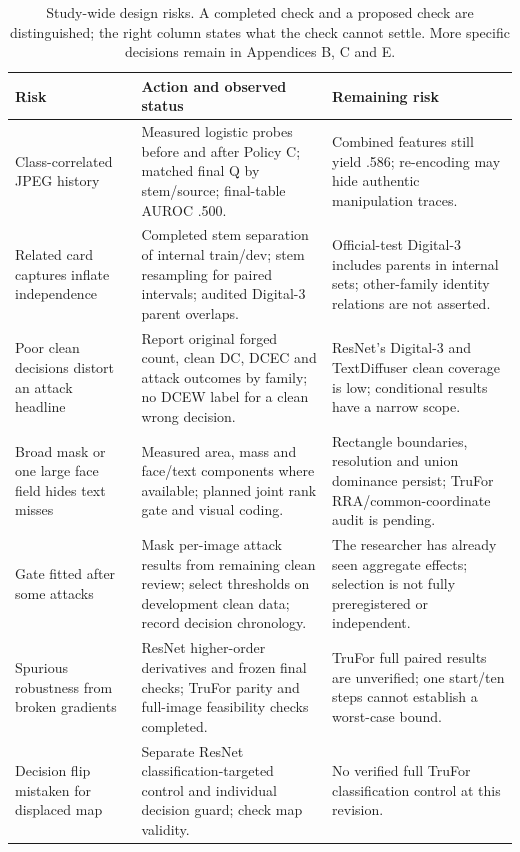 \begin{table}[H]
\centering\footnotesize
\caption{Study-wide design risks. A completed check and a proposed check are distinguished; the right column states what the check cannot settle. More specific decisions remain in Appendices B, C and E.}
\label{tab:app-method-risks}
\begin{tabularx}{\textwidth}{@{}>{\raggedright\arraybackslash}p{}>{\raggedright\arraybackslash}p{}X@{}}
\toprule
Risk & Action and observed status & Remaining risk \\
\midrule
Class-correlated JPEG history & Measured logistic probes before and after Policy C; matched final Q by stem/source; final-table AUROC .500. & Combined features still yield .586; re-encoding may hide authentic manipulation traces. \\
Related card captures inflate independence & Completed stem separation of internal train/dev; stem resampling for paired intervals; audited Digital-3 parent overlaps. & Official-test Digital-3 includes parents in internal sets; other-family identity relations are not asserted. \\
Poor clean decisions distort an attack headline & Report original forged count, clean DC, DCEC and attack outcomes by family; no DCEW label for a clean wrong decision. & ResNet's Digital-3 and TextDiffuser clean coverage is low; conditional results have a narrow scope. \\
Broad mask or one large face field hides text misses & Measured area, mass and face/text components where available; planned joint rank gate and visual coding. & Rectangle boundaries, resolution and union dominance persist; TruFor RRA/common-coordinate audit is pending. \\
Gate fitted after some attacks & Mask per-image attack results from remaining clean review; select thresholds on development clean data; record decision chronology. & The researcher has already seen aggregate effects; selection is not fully preregistered or independent. \\
Spurious robustness from broken gradients & ResNet higher-order derivatives and frozen final checks; TruFor parity and full-image feasibility checks completed. & TruFor full paired results are unverified; one start/ten steps cannot establish a worst-case bound. \\
Decision flip mistaken for displaced map & Separate ResNet classification-targeted control and individual decision guard; check map validity. & No verified full TruFor classification control at this revision. \\

\end{tabularx}
\end{table}
